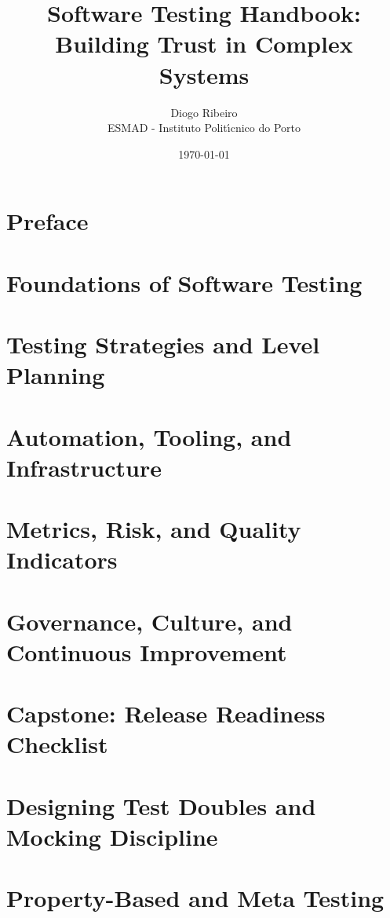 \documentclass[12pt,a4paper]{book}
\title{Software Testing Handbook:\\Building Trust in Complex Systems}
\author{Diogo Ribeiro\\ESMAD - Instituto Polit{\'\i}cnico do Porto}
\date{\today}
\begin{document}
\frontmatter
\maketitle
\tableofcontents
\listoffigures

\mainmatter

\chapter{Preface}


\chapter{Foundations of Software Testing}


\chapter{Testing Strategies and Level Planning}


\chapter{Automation, Tooling, and Infrastructure}


\chapter{Metrics, Risk, and Quality Indicators}


\chapter{Governance, Culture, and Continuous Improvement}


\chapter{Capstone: Release Readiness Checklist}


\chapter{Designing Test Doubles and Mocking Discipline}


\chapter{Property-Based and Meta Testing}

\end{document}

